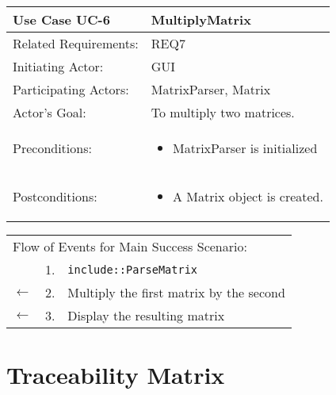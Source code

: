 \documentclass[11pt,letterpaper]{article}
\newcommand{\code}[1]{\texttt{#1}}
\begin{document}
\newpage
\begin{center}
\begin{tabular}{p{1.5in}p{5in}}
\hline
\textbf{Use Case UC-6}     & \textbf{MultiplyMatrix} \\ \hline
Related Requirements: & REQ7 \\
Initiating Actor:     & GUI \\
Participating Actors: &MatrixParser, Matrix \\
Actor's Goal:          & To multiply two matrices. \\
Preconditions:         & \begin{itemize}[nosep]
		      \item  MatrixParser is initialized
                         \end{itemize} \\
Postconditions:        & \begin{itemize}[nosep]
                         \item A Matrix object is created.
                         \end{itemize} \\ \hline
\end{tabular}

\begin{tabular}{p{.25in}p{.25in}p{5.8in}}
\multicolumn{3}{l}{Flow of Events for Main Success Scenario:} \\
              & 1. & \code{include::ParseMatrix}\\
$\leftarrow$  & 2. & Multiply the first matrix by the second\\
$\leftarrow$ & 3. & Display the resulting matrix\\
\end{tabular}
\end{center}



\newpage



\section{Traceability Matrix}
\end{document}
